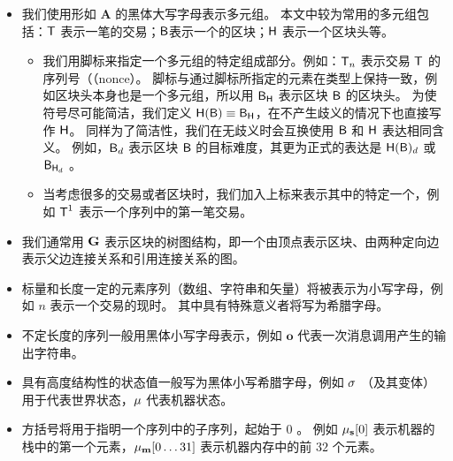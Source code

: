 \begin{itemize}[nosep]
	
	
	\item 我们使用形如  $\mathbf{A}$ 的黑体大写字母表示多元组。
	本文中较为常用的多元组包括：$\textsf{T}$ 表示一笔{\name}的交易；$\textsf{B}$表示一个{\name}的区块；$\textsf{H}$ 表示一个区块头等。
	\begin{itemize}[nosep]
		\item 我们用脚标来指定一个多元组的特定组成部分。例如：$\textsf{T}_n$ 表示交易 $\textsf{T}$ 的序列号（（nonce）。
		脚标与通过脚标所指定的元素在类型上保持一致，例如区块头本身也是一个多元组，所以用 $\textsf{B}_{\textsf{H}}$ 表示区块 $\textsf{B}$ 的区块头。
		为使符号尽可能简洁，我们定义 $\textsf{H}(\textsf{B})\equiv \textsf{B}_{\textsf{H}}$，在不产生歧义的情况下也直接写作 $\textsf{H}$。
		同样为了简洁性，我们在无歧义时会互换使用 $\textsf{B}$ 和 $\textsf{H}$ 表达相同含义。
		例如，$\textsf{B}_d$ 表示区块 $\textsf{B}$ 的目标难度，其更为正式的表达是 $\textsf{H}(\textsf{B})_d$ 或 $\textsf{B}_{\textsf{H}_d}$ 。
		
		
		\item 当考虑很多的交易或者区块时，我们加入上标来表示其中的特定一个，例如 $\textsf{T}^1$ 表示一个序列中的第一笔交易。
	\end{itemize}
	
	
	\item 我们通常用 $\textbf{G}$ 表示区块的树图结构，即一个由顶点表示区块、由两种定向边表示父边连接关系和引用连接关系的图。
	
	
	\item 标量和长度一定的元素序列（数组、字符串和矢量）将被表示为小写字母，例如 $n$ 表示一个交易的现时。
	其中具有特殊意义者将写为希腊字母。
	
	
	\item 不定长度的序列一般用黑体小写字母表示，例如 $\mathbf{o}$ 代表一次消息调用产生的输出字符串。
	
	
	\item 具有高度结构性的状态值一般写为黑体小写希腊字母，例如 $\mathbf{\sigma}$ （及其变体）用于代表世界状态，$\mathbf{\mu}$ 代表机器状态。
	
	
	\item 方括号将用于指明一个序列中的子序列，起始于 $0$ 。
	例如 $\mathbf{\mu}_{\mathbf{s}}[0]$ 表示机器的栈中的第一个元素，$\mathbf{\mu}_{\mathbf{m}}[0\dots 31]$ 表示机器内存中的前 $32$ 个元素。
	

\end{itemize}
